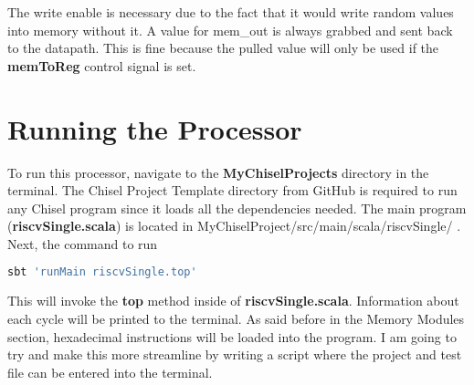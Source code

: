 \documentclass[12pt, letterpaper]{report}
\begin{document}
The write enable is necessary due to the fact that it would write random values into memory without it. 
A value for mem\_out is always grabbed and sent back to the datapath. This is fine because the pulled value will
only be used if the \textbf{memToReg} control signal is set.

\section{Running the Processor}
To run this processor, navigate to the \textbf{MyChiselProjects} directory in the terminal. The Chisel Project Template directory from GitHub is required to run any Chisel program since it loads all the dependencies needed. The main program (\textbf{riscvSingle.scala}) is located in MyChiselProject/src/main/scala/riscvSingle/ .
Next, the command to run 

\begin{lstlisting}[language=bash]
	sbt 'runMain riscvSingle.top'
\end{lstlisting}

This will invoke the \textbf{top} method inside of \textbf{riscvSingle.scala}. Information about each cycle will be printed to the terminal. As said before in the Memory Modules section, hexadecimal instructions will be loaded into the program. I am going to try and make this more streamline by writing a script where the project and test file can be entered into the terminal. 
\end{document}
